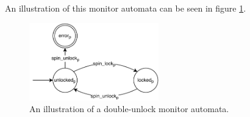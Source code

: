An illustration of this monitor automata can be seen in figure \ref{double-unlock-automata}. 

\begin{figure}[H]
    \centering
    \includegraphics[width=0.5\textwidth]{background/figures/double-unlock}
    \caption{An illustration of a double-unlock monitor automata.}
    \label{double-unlock-automata}
\end{figure}
    
